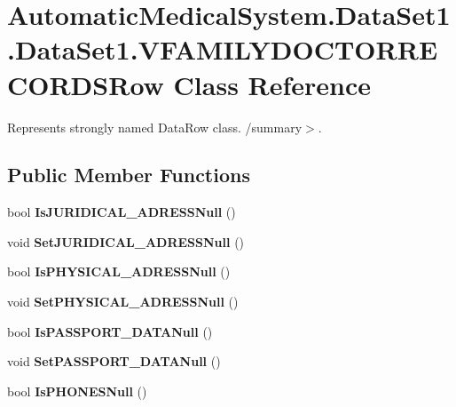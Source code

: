\section{AutomaticMedicalSystem.DataSet1.DataSet1.VFAMILYDOCTORRECORDSRow Class Reference}
\label{class_automatic_medical_system_1_1_data_set1_1_1_v_f_a_m_i_l_y_d_o_c_t_o_r_r_e_c_o_r_d_s_row}
Represents strongly named DataRow class. /summary$>$.  


\subsection*{Public Member Functions}
\begin{CompactItemize}
\item 
bool \textbf{IsJURIDICAL\_\-ADRESSNull} ()\label{class_automatic_medical_system_1_1_data_set1_1_1_v_f_a_m_i_l_y_d_o_c_t_o_r_r_e_c_o_r_d_s_row_5d1bce4ed74391910799ec5a5e80d8ab}

\item 
void \textbf{SetJURIDICAL\_\-ADRESSNull} ()\label{class_automatic_medical_system_1_1_data_set1_1_1_v_f_a_m_i_l_y_d_o_c_t_o_r_r_e_c_o_r_d_s_row_b25cc50c6a7cc58cc935fd614d3824bc}

\item 
bool \textbf{IsPHYSICAL\_\-ADRESSNull} ()\label{class_automatic_medical_system_1_1_data_set1_1_1_v_f_a_m_i_l_y_d_o_c_t_o_r_r_e_c_o_r_d_s_row_f16a4200c2fc81590d6bf60e1072b07b}

\item 
void \textbf{SetPHYSICAL\_\-ADRESSNull} ()\label{class_automatic_medical_system_1_1_data_set1_1_1_v_f_a_m_i_l_y_d_o_c_t_o_r_r_e_c_o_r_d_s_row_d1a32f5bef7e5e66b109d3049face9b8}

\item 
bool \textbf{IsPASSPORT\_\-DATANull} ()\label{class_automatic_medical_system_1_1_data_set1_1_1_v_f_a_m_i_l_y_d_o_c_t_o_r_r_e_c_o_r_d_s_row_0c6cbee2eec8fc763fd8f4ae3d41a553}

\item 
void \textbf{SetPASSPORT\_\-DATANull} ()\label{class_automatic_medical_system_1_1_data_set1_1_1_v_f_a_m_i_l_y_d_o_c_t_o_r_r_e_c_o_r_d_s_row_6f49fac678bcf8c126c2e8dad82f970a}

\item 
bool \textbf{IsPHONESNull} ()\label{class_automatic_medical_system_1_1_data_set1_1_1_v_f_a_m_i_l_y_d_o_c_t_o_r_r_e_c_o_r_d_s_row_6ccb4d96fcb1b8aec9f0000ddd7a1782}


\end{CompactItemize}
